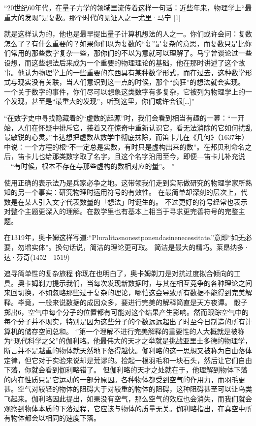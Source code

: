“20世纪60年代，在量子力学的领域里流传着这样一句话：近些年来，物理学上“最重大的发现”是复数。那个时代的见证人之一尤里·马宁
[1]

就是这样认为的，他也是最早提出量子计算机想法的人之一。你们或许会问：复数怎么了？有什么重要的？如果你们以为复数的“复”是复杂的意思，而复数只是比你们常用的那些数字复杂一些，那你们的不以为意就可以理解了。马宁曾谈论过一些设想，而这些想法后来成为一个重要的物理理论的基础，他在那时讲述了这个故事。他认为物理学上的一些重要的东西具有某种数学形式，而在过去，这种数学形式与现实没有关联，当人们意识到这一点的时候，那个“疯狂”的想法就会实现。
一个关于数字的事件，你们尽可以想象这类数字有多复杂，它被列为物理学上的一个发现，甚至是“最重大的发现”，听到这里，你们或许会很[…]”


“在数字史中寻找隐藏着的“虚数的起源”时，我们会看到相当有趣的一幕：“一开始，人们在怀疑中排斥它，接着又在惊奇中重新认识它，看无法消除的它如何扰乱最敏锐的心灵。”韦达想把虚数从数学中彻底抹除，而笛卡儿在《几何》（1637年）中说：一个方程的根“不一定总是实数，有时只是虚构出来的数”。在邦贝利命名之后，笛卡儿也给那类数字取了名字，且这个名字沿用至今，即便---笛卡儿补充说---“有时候，根本不存在与那些虚构的数相对应的量”。
”

使用正确的表示法乃是兵家必争之地。这带领我们走到实际做研究的物理学家所熟知的另一个事实：研究物理时运用符号的有效性。
在最简单却深刻的层次上，代数是在某人引入文字代表数量的「想法」时诞生的。
不过更好的符号经常也表示对整个主题更深入的理解。在数学里也有基本上相当于寻求更完善符号的完整主题。



在1319年，奥卡姆这样写道:“Pluralitasnonestponendasinenecessitate.”意即“如无必要，勿增实体”。换句话说，简洁的理论更可取。
简洁是最大的精巧。莱昂纳多·达·芬奇(1452—1519)

追寻简单性的复杂旅程
你现在也明白了，奥卡姆剃刀是对抗过度拟合倾向的工具。奥卡姆剃刀提示我们，当每次发现新数据时，与其在相互竞争的各种理论之间来回切换，不如忽略那些过于复杂的理论，哪怕这会导致所有数据不能得到完美解释。毕竟，一般来说数据的成因众多，要进行完美的解释简直是天方夜谭。
骰子掷出6，空气中每个分子的位置都有可能对这个结果产生影响。然而跟踪空气中的每个分子并不现实，特别是因为这些分子的个数远远超出了时至今日制造的所有计算机的储存空间总和。
‘’第一个理解不进行完美解释的重要性的人大概就是被称为“现代科学之父”的伽利略。他最伟大的天才之举就是挑战亚里士多德的物理学，断言并不是越重的物体就天然地下落得越快。伽利略的这一思想又被称为自由落体定律，但它对于实验来说却是荒谬的。捡起一根羽毛和一块石头，然后让它们自由下落，你就会看到伽利略错了。
但伽利略的天才之处就在于，他理解到物体下落的内在性质只是它运动的一部分原因。各种物体都受到空气的作用力，而羽毛更甚。空气对较轻的物体的阻碍大于对较重的物体的阻碍，这种阻碍甚至可以让鸟类飞起来。伽利略因此提出，如果没有空气，那么空气的效应也会消失，而我们就会观察到物体本质的下落过程，它应该与物体的质量无关。伽利略指出，在真空中所有物体都会以相同的速度下落。

